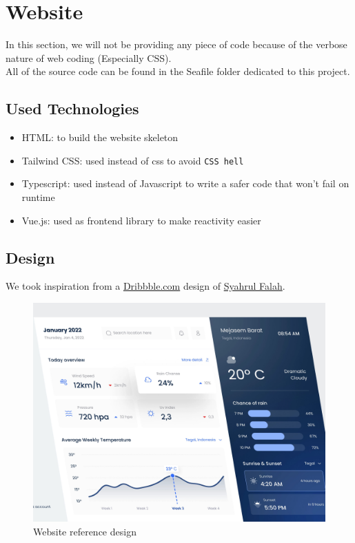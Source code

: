 \section{Website}
In this section, we will not be providing any piece of code because of the verbose nature of web coding (Especially CSS). \\
All of the source code can be found in the Seafile folder dedicated to this project.

\subsection{Used Technologies}
\begin{itemize}
    \item HTML: to build the website skeleton
    \item Tailwind CSS: used instead of css to avoid \verb|CSS hell|
    \item Typescript: used instead of Javascript to write a safer code that won't fail on runtime
    \item Vue.js: used as frontend library to make reactivity easier
\end{itemize}


\subsection{Design}
We took inspiration from a \href{www.dribbble.com}{Dribbble.com} design of \href{https://dribbble.com/syahrulfalah}{Syahrul Falah}.

\begin{figure}[H]
    \centering
    \includegraphics[width=.8\textwidth]{images/website/inspiration.jpg}
    \caption{Website reference design}
\end{figure}

